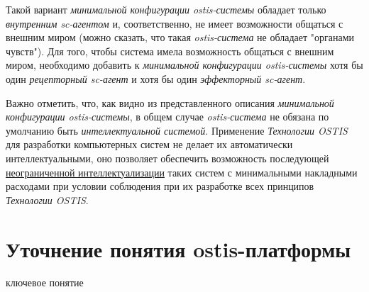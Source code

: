 Такой вариант \textit{минимальной конфигурации ostis-системы} обладает только \textit{внутренним sc-агентом} и, соответственно, не имеет возможности общаться с внешним миром (можно сказать, что такая \textit{ostis-система} не обладает "органами чувств"). Для того, чтобы система имела возможность общаться с внешним миром, необходимо добавить к \textit{минимальной конфигурации ostis-системы} хотя бы один \textit{рецепторный sc-агент} и хотя бы один \textit{эффекторный sc-агент}.

Важно отметить, что, как видно из представленного описания \textit{минимальной конфигурации ostis-системы}, в общем случае \textit{ostis-система} не обязана по умолчанию быть \textit{интеллектуальной системой}. Применение \textit{Технологии OSTIS} для разработки компьютерных систем не делает их автоматически интеллектуальными, оно позволяет обеспечить возможность последующей \uline{неограниченной интеллектуализации} таких систем с минимальными накладными расходами при условии соблюдения при их разработке всех принципов \textit{Технологии OSTIS}.

\section{Уточнение понятия ostis-платформы}
\label{sec_interpreter_ostis_platform}

\begin{SCn}
\begin{scnrelfromlist}{ключевое понятие}
\end{scnrelfromlist}
\end{SCn}

\begin{SCn}
\end{SCn}


